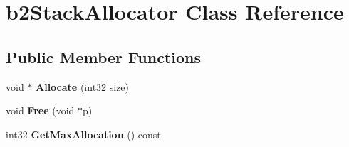 \hypertarget{classb2_stack_allocator}{}\section{b2\+Stack\+Allocator Class Reference}
\label{classb2_stack_allocator}
\subsection*{Public Member Functions}
\begin{DoxyCompactItemize}
\item 
void $\ast$ {\bfseries Allocate} (int32 size)\hypertarget{classb2_stack_allocator_a3319923944404ab8bad447db0e00d391}{}\label{classb2_stack_allocator_a3319923944404ab8bad447db0e00d391}

\item 
void {\bfseries Free} (void $\ast$p)\hypertarget{classb2_stack_allocator_a3a4384cf5f467828db3022985673db66}{}\label{classb2_stack_allocator_a3a4384cf5f467828db3022985673db66}

\item 
int32 {\bfseries Get\+Max\+Allocation} () const \hypertarget{classb2_stack_allocator_a1530b6889eaa679ab1b0e092e4911366}{}\label{classb2_stack_allocator_a1530b6889eaa679ab1b0e092e4911366}

\end{DoxyCompactItemize}
